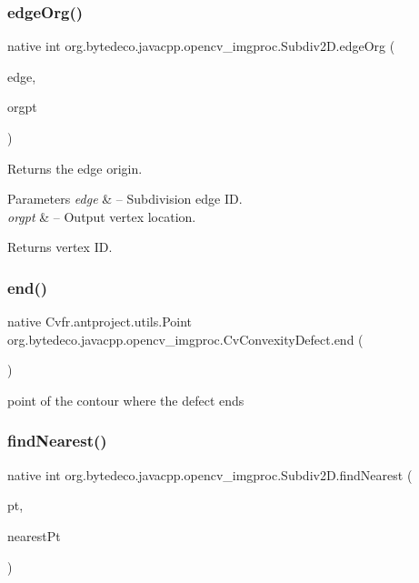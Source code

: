\subsubsection{\texorpdfstring{edge\+Org()}{edgeOrg()}}
{\footnotesize\ttfamily native int org.\+bytedeco.\+javacpp.\+opencv\+\_\+imgproc.\+Subdiv2\+D.\+edge\+Org (\begin{DoxyParamCaption}\item[{int}]{edge,  }\item[{Point2f}]{orgpt }\end{DoxyParamCaption})}



Returns the edge origin. 


\begin{DoxyParams}{Parameters}
{\em edge} & – Subdivision edge ID. \\
\hline
{\em orgpt} & – Output vertex location. \\
\hline
\end{DoxyParams}
\begin{DoxyReturn}{Returns}
vertex ID. 
\end{DoxyReturn}
\mbox{\label{group__imgproc_ga615474a436d4aa8cf5e74cbc1648f50b}} 
\subsubsection{\texorpdfstring{end()}{end()}}
{\footnotesize\ttfamily native Cv\+fr.antproject.utils.Point org.\+bytedeco.\+javacpp.\+opencv\+\_\+imgproc.\+Cv\+Convexity\+Defect.\+end (\begin{DoxyParamCaption}{ }\end{DoxyParamCaption})}

point of the contour where the defect ends \mbox{\label{group__imgproc_gaf945545a23188d47dc1fdfb4332707be}} 
\subsubsection{\texorpdfstring{find\+Nearest()}{findNearest()}}
{\footnotesize\ttfamily native int org.\+bytedeco.\+javacpp.\+opencv\+\_\+imgproc.\+Subdiv2\+D.\+find\+Nearest (\begin{DoxyParamCaption}\item[{@By\+Val Point2f}]{pt,  }\item[{Point2f}]{nearest\+Pt }\end{DoxyParamCaption})}



